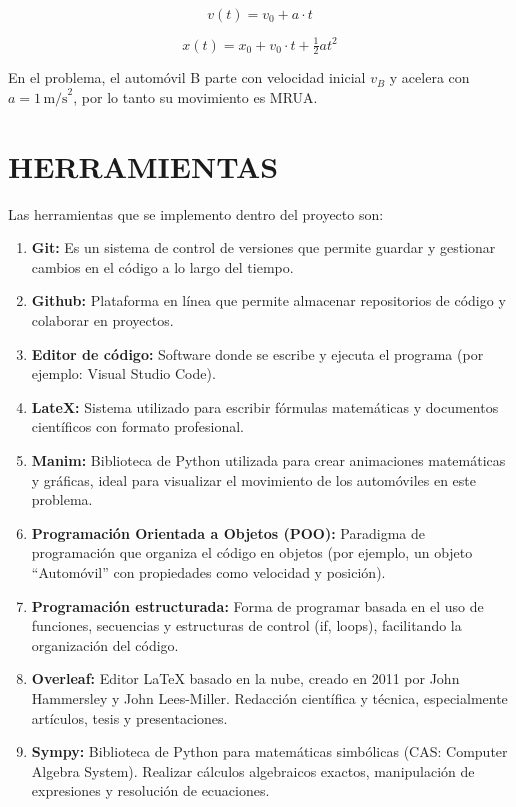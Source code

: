 \documentclass[12pt,a4paper]{article}
\begin{document}
\[
v(t) = v_0 + a \cdot t
\]




\[
x(t) = x_0 + v_0 \cdot t + \tfrac{1}{2} a t^2
\]


En el problema, el automóvil B parte con velocidad inicial \(v_B\) y acelera con \(a = 1 \,\text{m/s}^2\), por lo tanto su movimiento es MRUA.

\section{HERRAMIENTAS}

Las herramientas que se implemento dentro del proyecto son:
\begin{enumerate}
\item \textbf{Git:} Es un sistema de control de versiones que permite guardar y gestionar cambios en el código a lo largo del tiempo.
\item \textbf{Github:} Plataforma en línea que permite almacenar repositorios de código y colaborar en proyectos.
\item \textbf{Editor de código:} Software donde se escribe y ejecuta el programa (por ejemplo: Visual Studio Code).
\item \textbf{LateX:} Sistema utilizado para escribir fórmulas matemáticas y documentos científicos con formato profesional.
\item \textbf{Manim:} Biblioteca de Python utilizada para crear animaciones matemáticas y gráficas, ideal para visualizar el movimiento de los automóviles en este problema.
\item \textbf{Programación Orientada a Objetos (POO):} Paradigma de programación que organiza el código en objetos (por ejemplo, un objeto “Automóvil” con propiedades como velocidad y posición).
\item \textbf{Programación estructurada:} Forma de programar basada en el uso de funciones, secuencias y estructuras de control (if, loops), facilitando la organización del código.
\item \textbf{Overleaf:} Editor LaTeX basado en la nube, creado en 2011 por John Hammersley y John Lees-Miller. Redacción científica y técnica, especialmente artículos, tesis y presentaciones.
\item \textbf{Sympy:} Biblioteca de Python para matemáticas simbólicas (CAS: Computer Algebra System). Realizar cálculos algebraicos exactos, manipulación de expresiones y resolución de ecuaciones.
    
\end{enumerate}
\end{document}
